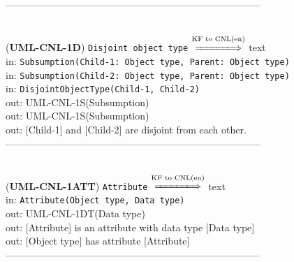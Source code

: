 \documentclass[sn-mathphys]{sn-jnl}
\begin{document}
{{{{{{%
------------------------------------------------------------------------------
\\ \

({\bf UML-CNL-1D}) {\tt Disjoint object type} $\overset{\text{KF to CNL(en)}}{\xLongrightarrow{\hspace*{1.4cm}}}$ {text}\\
\hspace*{0.3cm}in: {\tt Subsumption(Child-1: Object type, Parent: Object type)} \\
\hspace*{0.3cm}in: {\tt Subsumption(Child-2: Object type, Parent: Object type)} \\
\hspace*{0.3cm}in: {\tt DisjointObjectType(Child-1, Child-2)} \\
\hspace*{0.5cm}out:  {UML-CNL-1S(Subsumption)}\\
\hspace*{0.5cm}out:  {UML-CNL-1S(Subsumption)}\\
\hspace*{0.5cm}out:  [Child-1] and [Child-2] are disjoint from each other.\\

------------------------------------------------------------------------------
\\ \


({\bf UML-CNL-1ATT}) {\tt Attribute} $\overset{\text{KF to CNL(en)}}{\xLongrightarrow{\hspace*{1.4cm}}}$ {text}\\
\hspace*{0.3cm}in: {\tt Attribute(Object type, Data type)}\\
\hspace*{0.5cm}out: {UML-CNL-1DT(Data type)}\\
\hspace*{0.5cm}out: [Attribute] is an attribute with data type [Data type]\\
\hspace*{0.5cm}out: [Object type] has attribute [Attribute]\\

------------------------------------------------------------------------------
\\ \


}}}}}}
\end{document}
